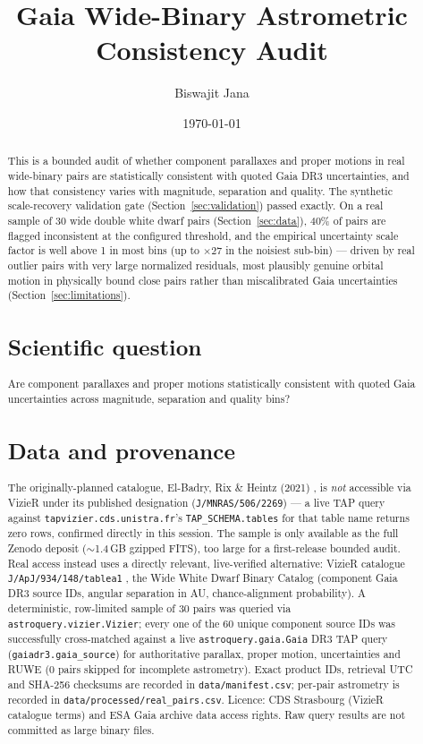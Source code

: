 \documentclass[11pt]{article}
\title{Gaia Wide-Binary Astrometric Consistency Audit}
\author{Biswajit Jana}
\date{\today}
\begin{document}
\maketitle

\begin{abstract}
This is a bounded audit of whether component parallaxes and proper motions in
real wide-binary pairs are statistically consistent with quoted Gaia DR3
uncertainties, and how that consistency varies with magnitude, separation and
quality. The synthetic scale-recovery validation gate
(Section~\ref{sec:validation}) passed exactly. On a real sample of 30 wide
double white dwarf pairs (Section~\ref{sec:data}), 40\% of pairs are flagged
inconsistent at the configured threshold, and the empirical uncertainty scale
factor is well above 1 in most bins (up to $\times 27$ in the noisiest
sub-bin) --- driven by real outlier pairs with very large normalized
residuals, most plausibly genuine orbital motion in physically bound close
pairs rather than miscalibrated Gaia uncertainties (Section~\ref{sec:limitations}).

\section{Scientific question}
Are component parallaxes and proper motions statistically consistent with
quoted Gaia uncertainties across magnitude, separation and quality bins?

\section{Data and provenance}
\label{sec:data}
The originally-planned catalogue, El-Badry, Rix \& Heintz (2021)
\citep{ElBadry2021WideBinaries}, is \emph{not} accessible via VizieR under its
published designation (\texttt{J/MNRAS/506/2269}) --- a live TAP query
against \texttt{tapvizier.cds.unistra.fr}'s \texttt{TAP\_SCHEMA.tables} for
that table name returns zero rows, confirmed directly in this session. The
sample is only available as the full Zenodo deposit
\citep{ElBadryZenodo2021} ($\sim$1.4\,GB gzipped FITS), too large for a
first-release bounded audit. Real access instead uses a directly relevant,
live-verified alternative: VizieR catalogue \texttt{J/ApJ/934/148/tablea1}
\citep{HeintzWDWD2023}, the Wide White Dwarf Binary Catalog (component Gaia
DR3 source IDs, angular separation in AU, chance-alignment probability). A
deterministic, row-limited sample of 30 pairs was queried via
\texttt{astroquery.vizier.Vizier}; every one of the 60 unique component
source IDs was successfully cross-matched against a live
\texttt{astroquery.gaia.Gaia} DR3 TAP query
(\texttt{gaiadr3.gaia\_source}) for authoritative parallax, proper motion,
uncertainties and RUWE (0 pairs skipped for incomplete astrometry). Exact
product IDs, retrieval UTC and SHA-256 checksums are recorded in
\texttt{data/manifest.csv}; per-pair astrometry is recorded in
\texttt{data/processed/real\_pairs.csv}. Licence: CDS Strasbourg (VizieR
catalogue terms) and ESA Gaia archive data access rights. Raw query results
are not committed as large binary files.


\end{abstract}
\end{document}
